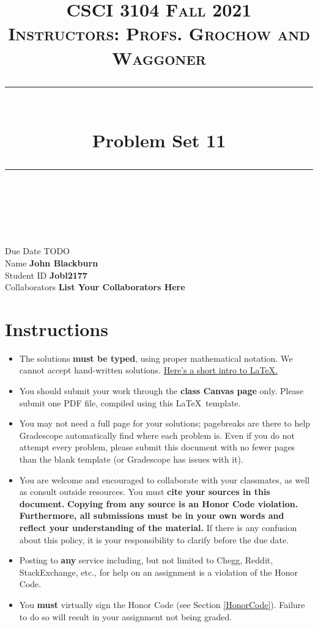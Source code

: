 \documentclass[11pt]{article}
\title{
\normalfont \normalsize 
\textsc{CSCI 3104 Fall 2021 \\ 
Instructors: Profs. Grochow and Waggoner} \\
[10pt] 
\rule{\linewidth}{0.5pt} \\[6pt] 
\huge Problem Set 11 \\
\rule{\linewidth}{2pt}  \\[10pt]
}
\date{}
\theoremstyle{definition}
\theoremstyle{definition}
\theoremstyle{definition}
\begin{document}
\maketitle


\noindent
Due Date \dotfill TODO \\
Name \dotfill \textbf{John Blackburn} \\
Student ID \dotfill \textbf{Jobl2177} \\
Collaborators \dotfill \textbf{List Your Collaborators Here}

\tableofcontents

\section{Instructions}
 \begin{itemize}
	\item The solutions \textbf{must be typed}, using proper mathematical notation. We cannot accept hand-written solutions. \href{http://ece.uprm.edu/~caceros/latex/introduction.pdf}{Here's a short intro to \LaTeX.}
	\item You should submit your work through the \textbf{class Canvas page} only. Please submit one PDF file, compiled using this \LaTeX \ template.
	\item You may not need a full page for your solutions; pagebreaks are there to help Gradescope automatically find where each problem is. Even if you do not attempt every problem, please submit this document with no fewer pages than the blank template (or Gradescope has issues with it).

	\item You are welcome and encouraged to collaborate with your classmates, as well as consult outside resources. You must \textbf{cite your sources in this document.} \textbf{Copying from any source is an Honor Code violation. Furthermore, all submissions must be in your own words and reflect your understanding of the material.} If there is any confusion about this policy, it is your responsibility to clarify before the due date. 

	\item Posting to \textbf{any} service including, but not limited to Chegg, Reddit, StackExchange, etc., for help on an assignment is a violation of the Honor Code.

	\item You \textbf{must} virtually sign the Honor Code (see Section \ref{HonorCode}). Failure to do so will result in your assignment not being graded.
\end{itemize}
\end{document}
